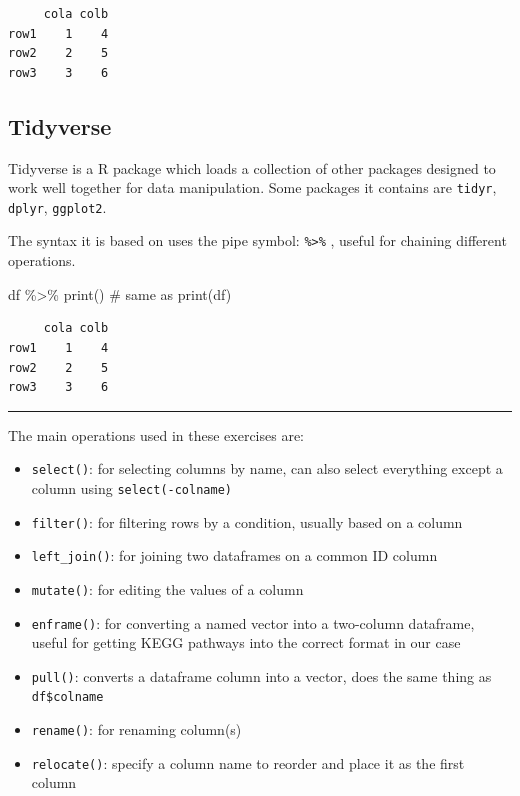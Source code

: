 \documentclass[
  24px,
  letterpaper,
  DIV=11,
  numbers=noendperiod]{scrartcl}
\newenvironment{Shaded}{\begin{snugshade}}{\end{snugshade}}
\newcommand{\CommentTok}[1]{\textcolor[rgb]{0.37,0.37,0.37}{#1}}
\newcommand{\FunctionTok}[1]{\textcolor[rgb]{0.28,0.35,0.67}{#1}}
\newcommand{\NormalTok}[1]{\textcolor[rgb]{0.00,0.23,0.31}{#1}}
\newcommand{\SpecialCharTok}[1]{\textcolor[rgb]{0.37,0.37,0.37}{#1}}
\begin{document}
\begin{verbatim}
     cola colb
row1    1    4
row2    2    5
row3    3    6
\end{verbatim}

\hypertarget{tidyverse}{%
\subsection{Tidyverse}\label{tidyverse}}

Tidyverse is a R package which loads a collection of other packages
designed to work well together for data manipulation. Some packages it
contains are \texttt{tidyr}, \texttt{dplyr}, \texttt{ggplot2}.

The syntax it is based on uses the pipe symbol:
\texttt{\%\textgreater{}\%} , useful for chaining different operations.

\begin{Shaded}
\begin{Highlighting}[]
\NormalTok{df }\SpecialCharTok{\%\textgreater{}\%} \FunctionTok{print}\NormalTok{() }\CommentTok{\# same as print(df)}
\end{Highlighting}
\end{Shaded}

\begin{verbatim}
     cola colb
row1    1    4
row2    2    5
row3    3    6
\end{verbatim}

\begin{center}\rule{0.5\linewidth}{0.5pt}\end{center}

The main operations used in these exercises are:

\begin{itemize}
\item
  \texttt{select()}: for selecting columns by name, can also select
  everything except a column using \texttt{select(-colname)}
\item
  \texttt{filter()}: for filtering rows by a condition, usually based on
  a column
\item
  \texttt{left\_join()}: for joining two dataframes on a common ID
  column
\item
  \texttt{mutate()}: for editing the values of a column
\item
  \texttt{enframe()}: for converting a named vector into a two-column
  dataframe, useful for getting KEGG pathways into the correct format in
  our case
\item
  \texttt{pull()}: converts a dataframe column into a vector, does the
  same thing as \texttt{df\$colname}
\item
  \texttt{rename()}: for renaming column(s)
\item
  \texttt{relocate()}: specify a column name to reorder and place it as
  the first column
\end{itemize}
\end{document}
